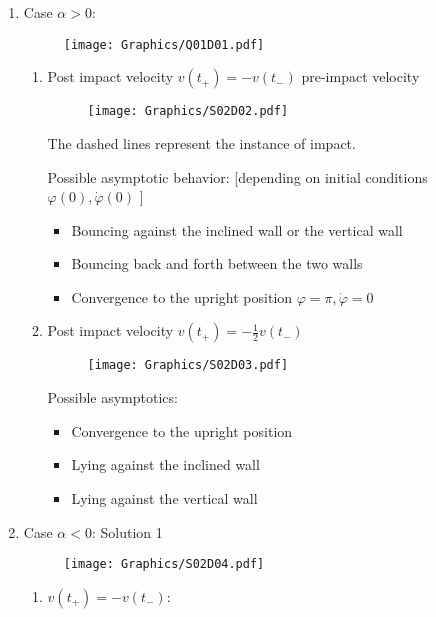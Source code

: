 \documentclass[twoside,10pt,a4paper]{article}
\begin{document}
\begin{enumerate}[label=(\arabic*)]
\item Case $\alpha > 0$:
\begin{figure}[H]
	\centering
	\texttt{[image: Graphics/Q01D01.pdf]}
\end{figure}

\newpage 
\begin{enumerate}[label=(\roman*)]
\item Post impact velocity $ v(t_+) = -v(t_-)$ pre-impact velocity

\begin{figure}[H]
	\centering
	\texttt{[image: Graphics/S02D02.pdf]}
\end{figure}
The dashed lines represent the instance of impact.

Possible asymptotic behavior: [depending on initial conditions $\varphi(0), \dot{\varphi}(0)$ ]

\begin{itemize}
	\item {\color{MyBlue}Bouncing against the inclined wall or the vertical wall}
	\item {\color{MyGreen}Bouncing back and forth between the two walls}
	\item {\color{MyRed}Convergence to the upright position $\varphi = \pi, \dot{\varphi}=0$}
\end{itemize}


\item Post impact velocity $ v(t_+) = -\frac{1}{2}v(t_-) $
\begin{figure}[H]
	\centering
	\texttt{[image: Graphics/S02D03.pdf]}
\end{figure}
Possible asymptotics:
\begin{itemize}
	\item Convergence to the upright position
	\item Lying against the inclined wall
	\item Lying against the vertical wall
\end{itemize}

\end{enumerate}
\newpage
\item Case $\alpha < 0$: Solution 1
\begin{figure}[H]
	\centering
	\texttt{[image: Graphics/S02D04.pdf]}
\end{figure}

\begin{enumerate}[label=(\roman*)]
	\item $ v(t_+) = -v(t_-) $:


\end{enumerate}
\end{enumerate}
\end{document}
